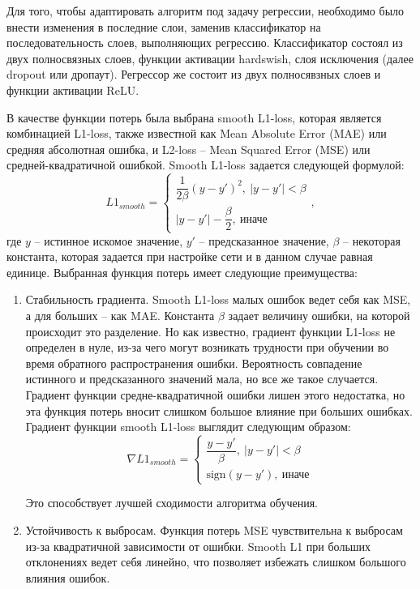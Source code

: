 Для того, чтобы адаптировать алгоритм под задачу регрессии, необходимо было внести изменения в последние слои, заменив классификатор на последовательность слоев, выполняющих регрессию. Классификатор состоял из двух полносвязных слоев, функции активации hardswish, слоя исключения (далее dropout или дропаут). Регрессор же состоит из двух полносявзных слоев и функции активации ReLU.

В качестве функции потерь была выбрана smooth L1-loss, которая является комбинацией L1-loss, также известной как Mean Absolute Error (MAE) или средняя абсолютная ошибка, и L2-loss -- Mean Squared Error (MSE) или средней-квадратичной ошибкой. Smooth L1-loss задается следующей формулой:
\begin{equation}
	L1_{smooth} =
	\begin{cases}
		\dfrac{1}{2\beta}(y-y')^2,\ |y-y'|<\beta \\
		|y-y'| - \dfrac{\beta}{2},\ \text{иначе}
	\end{cases},
\end{equation}
где $y$ -- истинное искомое значение, $y'$ -- предсказанное значение, $\beta$ -- некоторая константа, которая задается при настройке сети и в данном случае равная единице. Выбранная функция потерь имеет следующие преимущества:
\begin{enumerate}[1.]
	\item Стабильность градиента. Smooth L1-loss малых ошибок ведет себя как MSE, а для больших -- как MAE. Константа $\beta$ задает величину ошибки, на которой происходит это разделение. Но как известно, градиент функции L1-loss не определен в нуле, из-за чего могут возникать трудности при обучении во время обратного распространения ошибки. Вероятность совпадение истинного и предсказанного значений мала, но все же такое случается. Градиент функции средне-квадратичной ошибки лишен этого недостатка, но эта функция потерь вносит слишком большое влияние при больших ошибках. Градиент функции smooth L1-loss выглядит следующим образом:
	\begin{equation}
		\nabla L1_{smooth} = 
		\begin{cases}
			\dfrac{y-y'}{\beta},\ |y-y'|<\beta \\
			\text{sign}(y-y'),\ \text{иначе}
		\end{cases}
	\end{equation}
	
	Это способствует лучшей сходимости алгоритма обучения.
	
	\item Устойчивость к выбросам. Функция потерь MSE чувствительна к выбросам из-за квадратичной зависимости от ошибки. Smooth L1 при больших отклонениях ведет себя линейно, что позволяет избежать слишком большого влияния ошибок.
\end{enumerate}

